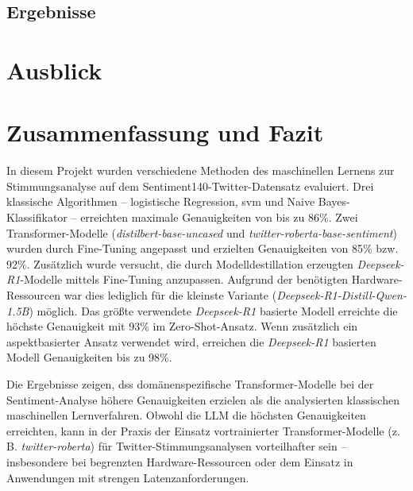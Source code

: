 \documentclass[researchlab,group,]{AIGpaper}
\begin{document}
\subsection{Ergebnisse}

\section{Ausblick}

\section{Zusammenfassung und Fazit}

In diesem Projekt wurden verschiedene Methoden des maschinellen Lernens zur Stimmungsanalyse auf dem Sentiment140-Twitter-Datensatz evaluiert. 
Drei klassische Algorithmen – logistische Regression, \gls{svm} und Naive Bayes-Klassifikator – erreichten maximale Genauigkeiten von bis zu 86\%. 
Zwei Transformer-Modelle (\emph{distilbert-base-uncased} und \emph{twitter-roberta-base-sentiment}) wurden durch Fine-Tuning angepasst und erzielten Genauigkeiten von 85\% bzw. 92\%. 
Zusätzlich wurde versucht, die durch Modelldestillation erzeugten \emph{Deepseek-R1}-Modelle mittels Fine-Tuning anzupassen. Aufgrund der benötigten Hardware-Ressourcen war dies lediglich für die kleinste Variante (\emph{Deepseek-R1-Distill-Qwen-1.5B}) möglich. 
Das größte verwendete \emph{Deepseek-R1} basierte Modell erreichte die höchste Genauigkeit mit 93\% im Zero-Shot-Ansatz. 
Wenn zusätzlich ein aspektbasierter Ansatz verwendet wird, erreichen die \emph{Deepseek-R1} basierten Modell Genauigkeiten bis zu 98\%.

Die Ergebnisse zeigen, dss domänenspezifische Transformer-Modelle bei der Sentiment-Analyse höhere Genauigkeiten erzielen als die analysierten klassischen maschinellen Lernverfahren. 
Obwohl die LLM die höchsten Genauigkeiten erreichten, kann in der Praxis der Einsatz vortrainierter Transformer-Modelle (z. B. \emph{twitter-roberta}) für Twitter-Stimmungsanalysen vorteilhafter sein – insbesondere bei begrenzten Hardware-Ressourcen oder dem Einsatz in Anwendungen mit strengen Latenzanforderungen.

\newpage
\addreferences

\end{document}
